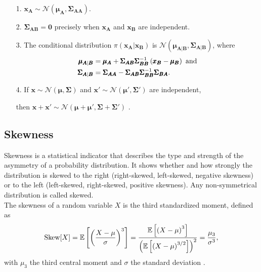 \begin{itemize}
    \item[1.] $\pmb{x}_{\pmb{A}}\sim\mathcal{N}\left(\pmb{\mu}_{\pmb{A}}, \pmb{\Sigma}_{\pmb{AA}}\right)$.
    \item[2.] $\pmb{\Sigma}_{\pmb{AB}}=\pmb{0}$ precisely when $\pmb{x}_{\pmb{A}}$ and $\pmb{x}_{\pmb{B}}$ are independent.
    \item[3.] The conditional distribution $\pi\left(\pmb{x}_{\pmb{A}}|\pmb{x}_{\pmb{B}}\right)$ is $\mathcal{N}\left(\pmb{\mu}_{\pmb{A}|\pmb{B}}, \pmb{\Sigma}_{\pmb{A}|\pmb{B}}\right)$, where
    \begin{align*}
        \pmb{\mu}_{\pmb{A}|\pmb{B}} &= \pmb{\mu}_{\pmb{A}}+\pmb{\Sigma}_{\pmb{AB}}\pmb{\Sigma}_{\pmb{BB}}^{-1}\left(\pmb{x}_{\pmb{B}}-\pmb{\mu}_{\pmb{B}}\right) \hbox{ and} \\
        \pmb{\Sigma}_{\pmb{A}|\pmb{B}} &= \pmb{\Sigma}_{\pmb{AA}}-\pmb{\Sigma}_{\pmb{AB}}\pmb{\Sigma}_{\pmb{BB}}^{-1}\pmb{\Sigma}_{\pmb{BA}}.
    \end{align*}
    \item[4.] If $\pmb{x}\sim\mathcal{N}\left(\pmb{\mu}, \pmb{\Sigma}\right)$ and $\pmb{x}'\sim\mathcal{N}\left(\pmb{\mu'}, \pmb{\Sigma'}\right)$ are independent, 
    \item[]then $\pmb{x}+\pmb{x'}\sim\mathcal{N}\left(\pmb{\mu}+ \pmb{\mu'}, \pmb{\Sigma}+ \pmb{\Sigma'}\right)$ \autocite[][19--20]{rue2005gaussian}.
\end{itemize}
\clearpage
\subsection{Skewness}
Skewness is a statistical indicator that describes the type and strength of the asymmetry of a probability distribution. It shows whether and how strongly the distribution is skewed to the right (right-skewed, left-skewed, negative skewness) or to the left (left-skewed, right-skewed, positive skewness). Any non-symmetrical distribution is called skewed. \\
The skewness of a random variable $X$ is the third standardized moment, defined as
\begin{equation}
    \hbox{Skew}[X]=\mathbb{E}\left[\left(\frac{X-\mu}{\sigma}\right)^3\right] = \frac{\mathbb{E}\left[\left(X-\mu\right)^3\right]}{\left(\mathbb{E}\left[\left(X-\mu\right)^{3/2}\right]\right)^2}=\frac{\mu_3}{\sigma^3},
\end{equation}
with $\mu_3$ the third central moment and $\sigma$ the standard deviation \autocite[][]{doane2011measuring, wilkins1944note}.
